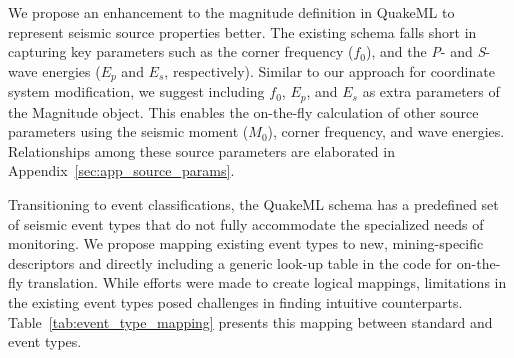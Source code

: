 We propose an enhancement to the magnitude definition in QuakeML to represent seismic source properties better. The existing schema falls short in capturing key parameters such as the corner frequency ($f_0$), and the \textit{P}- and \textit{S}-wave energies ($E_p$ and $E_s$, respectively). Similar to our approach for coordinate system modification, we suggest including $f_0$, $E_p$, and $E_s$ as extra parameters of the Magnitude object. This enables the on-the-fly calculation of other source parameters using the seismic moment ($M_0$), corner frequency, and wave energies. Relationships among these source parameters are elaborated in Appendix~\ref{sec:app_source_params}.

Transitioning to event classifications, the QuakeML schema has a predefined set of seismic event types that do not fully accommodate the specialized needs of \museismic monitoring. We propose mapping existing event types to new, mining-specific descriptors and directly including a generic look-up table in the code for on-the-fly translation. While efforts were made to create logical mappings, limitations in the existing event types posed challenges in finding intuitive counterparts. Table~\ref{tab:event_type_mapping} presents this mapping between standard and \museismic event types.

